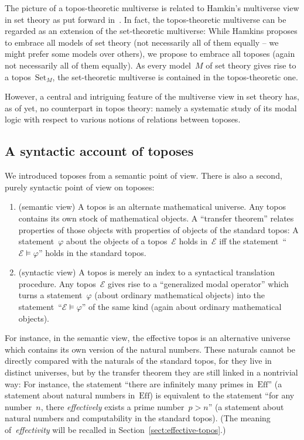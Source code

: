 \documentclass[graybox]{svmult}
\renewcommand{\E}{\mathcal{E}}
\newcommand{\Set}{\mathrm{Set}}
\newcommand{\Eff}{\mathrm{Ef{}f}}
\renewcommand{\_}{\mathpunct{.}\,}
\newcommand{\effective}{ef{}fective\xspace}
\newcommand{\effectively}{ef{}fectively\xspace}
\newcommand{\?}{\,{:}\,}
\begin{document}
\begin{remark}The picture of a topos-theoretic multiverse is related to Hamkin's
multiverse view in set theory as put forward in~\cite{hamkins:multiverse}. In fact, the
topos-theoretic multiverse can be regarded as an extension of the set-theoretic
multiverse: While Hamkins proposes to embrace all models of set theory (not
necessarily all of them equally -- we might prefer some models over others), we propose to embrace all toposes (again
not necessarily all of them equally). As every model~$M$ of set theory
gives rise to a topos~$\Set_M$, the set-theoretic multiverse is contained in the
topos-theoretic one.

However, a central and intriguing feature of the multiverse view in set theory
has, as of yet, no counterpart in topos theory: namely a systematic study of
its modal logic with respect to various notions of relations between toposes.\end{remark}


\subsection{A syntactic account of toposes} We introduced toposes from a semantic
point of view. There is also a second, purely syntactic point of view on
toposes:
\begin{enumerate}
\item (semantic view) A topos is an alternate mathematical universe. Any topos
contains its own stock of mathematical objects. A ``transfer theorem'' relates
properties of those objects with properties of objects of the standard topos: A
statement~$\varphi$ about the objects of a topos~$\E$ holds in~$\E$ iff the
statement~``$\E \models \varphi$'' holds in the standard topos.
\item (syntactic view) A topos is merely an index to a syntactical translation
procedure. Any topos~$\E$ gives rise to a ``generalized modal operator'' which
turns a statement~$\varphi$ (about ordinary mathematical objects) into the
statement~``$\E \models \varphi$'' of the same kind (again about ordinary
mathematical objects).
\end{enumerate}

For instance, in the semantic view, the \effective topos is an alternative
universe which contains its own version of the natural numbers. These naturals
cannot be directly compared with the naturals of the standard topos, for they
live in distinct universes, but by the transfer theorem they are still linked in a
nontrivial way: For instance, the statement ``there are infinitely many primes
in~$\Eff$'' (a statement about natural numbers in~$\Eff$) is equivalent to the statement
``for any number~$n$, there \emph{\effectively} exists a prime number~$p > n$''
(a statement about natural numbers and computability in the standard topos).
(The meaning of~\emph{effectivity} will be recalled in
Section~\ref{sect:effective-topos}.)
\end{document}

